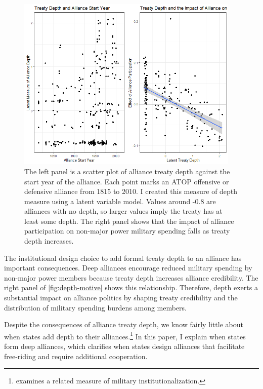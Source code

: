 \documentclass[12pt]{article}
\begin{document}
\begin{figure}[hbtp]
\centering
\includegraphics[width=0.95\textwidth]{../figures/depth-motive.png}
\caption{The left panel is a scatter plot of alliance treaty depth against the start year of the alliance. Each point marks an ATOP offensive or defensive alliance from 1815 to 2010. I created this measure of depth measure using a latent variable model. Values around -0.8 are alliances with no depth, so larger values imply the treaty has at least some depth. The right panel shows that the impact of alliance participation on non-major power military spending falls as treaty depth increases.}
\label{fig:depth-motive}
\end{figure}


The institutional design choice to add formal treaty depth to an alliance has important consequences. 
Deep alliances encourage reduced military spending by non-major power members because treaty depth increases alliance credibility.  
The right panel of \autoref{fig:depth-motive} shows this relationship. 
Therefore, depth exerts a substantial impact on alliance politics by shaping treaty credibility and the distribution of military spending burdens among members. 


Despite the consequences of alliance treaty depth, we know fairly little about when states add depth to their alliances.\footnote{\citet{Mattes2012} examines a related measure of military institutionalization.}
In this paper, I explain when states form deep alliances, which clarifies when states design alliances that facilitate free-riding and require additional cooperation.  
\end{document}
